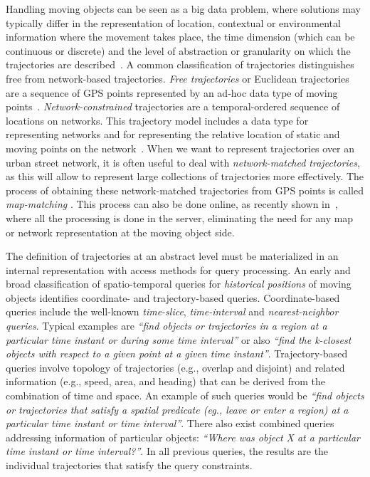 \documentclass[a4paper,10pt,twoside]{book}
\begin{document}
    Handling moving objects can be seen as a big data problem, where solutions may typically differ in the representation of location, contextual or environmental information where the movement takes place, the time dimension (which can be continuous or discrete) and the level of abstraction or granularity on which the trajectories are described~\cite{DBLP:journals/sigspatial/DamianiIGV15}. A common classification of trajectories distinguishes free from network-based trajectories.  \textit{Free trajectories} or Euclidean trajectories are a sequence of GPS points represented by an ad-hoc data type of moving points~\cite{DBLP:conf/ssdbm/WolfsonXCJ98,DBLP:conf/icde/SistlaWCD97,DBLP:journals/tods/GutingBEJLSV00}. \textit{Network-constrained} trajectories are a temporal-ordered sequence of locations on networks. This trajectory model includes a data type for representing  networks and  for representing the relative location of static and moving  points on the network~\cite{DBLP:journals/vldb/GutingAD06}. When we want to represent trajectories over an urban street network, it is often useful to deal with \textit{\mbox{network-matched} trajectories}, as this will allow to represent large collections of trajectories more effectively. The process of obtaining these \mbox{network-matched} trajectories from GPS points is called \textit{map-matching} \cite{brakatsoulas2005map}. This process can also be done online, as recently shown in~\cite{DBLP:journals/tits/Ding0GL15}, where all the processing is done in the server, eliminating the need for any map or network representation at the moving object side.
    
    The definition of trajectories at an abstract level must be materialized in an internal representation with access methods for query processing. An early and broad classification of spatio-temporal queries for \textit{historical positions} of moving objects \cite{DBLP:conf/vldb/PfoserJT00} identifies coordinate- and \mbox{trajectory-based} queries. \mbox{Coordinate-based} queries include the well-known  {\it time-slice}, {\it time-interval} and \textit{nearest-neighbor queries}. Typical examples are \textit{``find objects or trajectories in a region at a  particular time instant or during some time interval''} or also \textit{``find the k-closest objects with respect to a given point at a given time instant''}. \mbox{Trajectory-based} queries  involve topology of trajectories (e.g., overlap and disjoint) and related information (e.g., speed, area, and heading) that can be derived from the combination of time and space. An example of such queries would be  \textit{``find objects or trajectories that satisfy a spatial predicate (eg., leave or enter a region)  at a particular time instant or time interval''}. There also exist combined queries addressing information of particular objects: \textit{``Where was object X at a particular time instant or time interval?''}. In all previous queries, the results are the individual trajectories that satisfy the query constraints.
    
\end{document}
